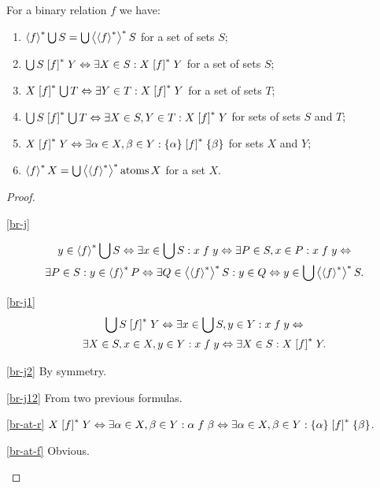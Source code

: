 \begin{prop}
For a binary relation $f$ we have:
\begin{enumerate}
\item \label{br-j}$\left\langle f\right\rangle ^{\ast}\bigcup S=\bigcup\left\langle \left\langle f\right\rangle ^{\ast}\right\rangle ^{\ast}S$ for
a set of sets $S$;
\item \label{br-j1}$\bigcup S\mathrel{\left[f\right]^{\ast}}Y\Leftrightarrow\exists X\in S:X\mathrel{\left[f\right]^{\ast}}Y$
for a set of sets $S$;
\item \label{br-j2}$X\mathrel{\left[f\right]^{\ast}}\bigcup T\Leftrightarrow\exists Y\in T:X\mathrel{\left[f\right]^{\ast}}Y$
for a set of sets $T$;
\item \label{br-j12}$\bigcup S\mathrel{\left[f\right]^{\ast}}\bigcup T\Leftrightarrow\exists X\in S,Y\in T:X\mathrel{\left[f\right]^{\ast}}Y$
for sets of sets $S$ and $T$;
\item \label{br-at-r}$X\mathrel{\left[f\right]^{\ast}}Y\Leftrightarrow\exists\alpha\in X,\beta\in Y:\{\alpha\}\mathrel{\left[f\right]^{\ast}}\{\beta\}$
for sets $X$ and $Y$;
\item \label{br-at-f}$\left\langle f\right\rangle ^{\ast}X=\bigcup\left\langle \left\langle f\right\rangle ^{\ast}\right\rangle ^{\ast}\operatorname{atoms} X$ for a
set $X$.
\end{enumerate}
\end{prop}
\begin{proof}
~
\begin{widedisorder}
\item [{\ref{br-j}}] ~

\begin{multline*}
y\in\left\langle f\right\rangle ^{\ast}\bigcup S\Leftrightarrow\exists x\in\bigcup S:x\mathrel fy\Leftrightarrow\exists P\in S,x\in P:x\mathrel fy\Leftrightarrow\\
\exists P\in S:y\in\left\langle f\right\rangle ^{\ast}P\Leftrightarrow\exists Q\in\left\langle \left\langle f\right\rangle ^{\ast}\right\rangle ^{\ast}S:y\in Q\Leftrightarrow y\in\bigcup\left\langle \left\langle f\right\rangle ^{\ast}\right\rangle ^{\ast}S.
\end{multline*}

\item [{\ref{br-j1}}] 
\begin{multline*}
\bigcup S\mathrel{\left[f\right]^{\ast}}Y\Leftrightarrow\exists x\in\bigcup S,y\in Y:x\mathrel fy\Leftrightarrow\\
\exists X\in S,x\in X,y\in Y:x\mathrel fy\Leftrightarrow\exists X\in S:X\mathrel{\left[f\right]^{\ast}}Y.
\end{multline*}

\item [{\ref{br-j2}}] By symmetry.
\item [{\ref{br-j12}}] From two previous formulas.
\item [{\ref{br-at-r}}] $X\mathrel{\left[f\right]^{\ast}}Y\Leftrightarrow\exists\alpha\in X,\beta\in Y:\alpha\mathrel f\beta\Leftrightarrow\exists\alpha\in X,\beta\in Y:\{\alpha\}\mathrel{\left[f\right]^{\ast}}\{\beta\}$.
\item [\ref{br-at-f}] Obvious.
\end{widedisorder}
\end{proof}
